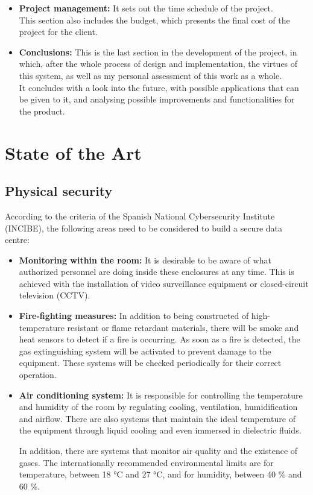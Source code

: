 \begin{itemize}
	\item \textbf{Project management:} It sets out the time schedule of the project. \\ This section also includes the budget, which presents the final cost of the project for the client.
	\item \textbf{Conclusions:} This is the last section in the development of the project, in which, after the whole process of design and implementation, the virtues of this system, as well as my personal assessment of this work as a whole. \\ It concludes with a look into the future, with possible applications that can be given to it, and analysing possible improvements and functionalities for the product.
\end{itemize}
\pagebreak

\section{State of the Art}\label{sec:state-of-the-art}
\subsection{Physical security}\label{subsec:physical-security}
According to the criteria of the Spanish National Cybersecurity Institute (INCIBE), the following areas need to be considered to build a secure data centre:
\begin{itemize}
	\item \textbf{Monitoring within the room:} It is desirable to be aware of what authorized personnel are doing inside these enclosures at any time. This is achieved with the installation of video surveillance equipment or closed-circuit television (CCTV).
	\item \textbf{Fire-fighting measures:} In addition to being constructed of high-temperature resistant or flame retardant materials, there will be smoke and heat sensors to detect if a fire is occurring. As soon as a fire is detected, the gas extinguishing system will be activated to prevent damage to the equipment. These systems will be checked periodically for their correct operation.
	\item \textbf{Air conditioning system:} It is responsible for controlling the temperature and humidity of the room by regulating cooling, ventilation, humidification and airflow. There are also systems that maintain the ideal temperature of the equipment through liquid cooling and even immersed in dielectric fluids.

	In addition, there are systems that monitor air quality and the existence of gases. The internationally recommended environmental limits are for temperature, between 18 °C and 27 °C, and for humidity, between 40 \% and 60 \%.
\end{itemize}

